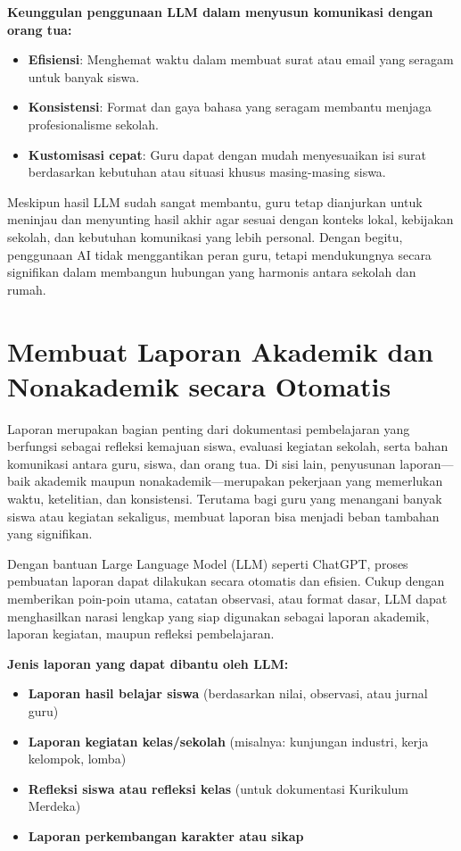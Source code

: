 \textbf{Keunggulan penggunaan LLM dalam menyusun komunikasi dengan orang tua:}
\begin{itemize}
	\item \textbf{Efisiensi}: Menghemat waktu dalam membuat surat atau email yang seragam untuk banyak siswa.
	\item \textbf{Konsistensi}: Format dan gaya bahasa yang seragam membantu menjaga profesionalisme sekolah.
	\item \textbf{Kustomisasi cepat}: Guru dapat dengan mudah menyesuaikan isi surat berdasarkan kebutuhan atau situasi khusus masing-masing siswa.
\end{itemize}

Meskipun hasil LLM sudah sangat membantu, guru tetap dianjurkan untuk meninjau dan menyunting hasil akhir agar sesuai dengan konteks lokal, kebijakan sekolah, dan kebutuhan komunikasi yang lebih personal. Dengan begitu, penggunaan AI tidak menggantikan peran guru, tetapi mendukungnya secara signifikan dalam membangun hubungan yang harmonis antara sekolah dan rumah.


\section{Membuat Laporan Akademik dan Nonakademik secara Otomatis}

Laporan merupakan bagian penting dari dokumentasi pembelajaran yang berfungsi sebagai refleksi kemajuan siswa, evaluasi kegiatan sekolah, serta bahan komunikasi antara guru, siswa, dan orang tua. Di sisi lain, penyusunan laporan—baik akademik maupun nonakademik—merupakan pekerjaan yang memerlukan waktu, ketelitian, dan konsistensi. Terutama bagi guru yang menangani banyak siswa atau kegiatan sekaligus, membuat laporan bisa menjadi beban tambahan yang signifikan.

Dengan bantuan Large Language Model (LLM) seperti ChatGPT, proses pembuatan laporan dapat dilakukan secara otomatis dan efisien. Cukup dengan memberikan poin-poin utama, catatan observasi, atau format dasar, LLM dapat menghasilkan narasi lengkap yang siap digunakan sebagai laporan akademik, laporan kegiatan, maupun refleksi pembelajaran.

\textbf{Jenis laporan yang dapat dibantu oleh LLM:}
\begin{itemize}
	\item \textbf{Laporan hasil belajar siswa} (berdasarkan nilai, observasi, atau jurnal guru)
	\item \textbf{Laporan kegiatan kelas/sekolah} (misalnya: kunjungan industri, kerja kelompok, lomba)
	\item \textbf{Refleksi siswa atau refleksi kelas} (untuk dokumentasi Kurikulum Merdeka)
	\item \textbf{Laporan perkembangan karakter atau sikap}
\end{itemize}

